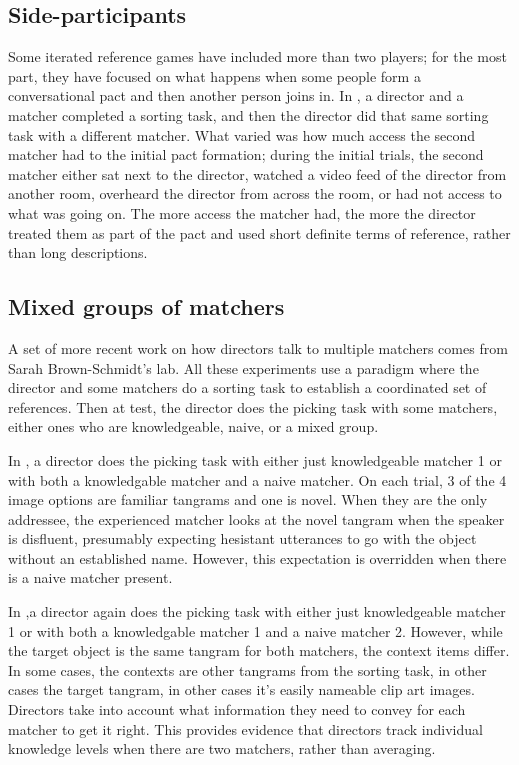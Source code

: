 \documentclass[11pt]{article}
\begin{document}
\subsection{Side-participants}
	Some iterated reference games have included more than two players; for the most part, they have focused on what happens when some people form a conversational pact and then another person joins in. 
	In 	\cite{wilkes-gibbsCoordinatingBeliefsConversation1992}, a director and a matcher completed a sorting task, and then the director did that same sorting task with a different matcher. What varied was how much access the second matcher had to the initial pact formation; during the initial trials, the second matcher either sat next to the director, watched a video feed of the director from another room, overheard the director from across the room, or had not access to what was going on. The more access the matcher had, the more the director treated them as part of the pact and used short definite terms of reference, rather than long descriptions.
	
	\subsection{Mixed groups of matchers}
	A set of more recent work on how directors talk to multiple matchers comes from Sarah Brown-Schmidt's lab. All these experiments use a paradigm where the director and some matchers do a sorting task to establish a coordinated set of references. Then at test, the director does the picking task with some matchers, either ones who are knowledgeable, naive, or a mixed group.
	
	In \cite{yoonAdjustingConceptualPacts2014}, a director does the picking task with either just knowledgeable matcher 1 or with both a knowledgable matcher and a naive matcher. On each trial, 3 of the 4 image options are familiar tangrams and one is novel. When they are the only addressee, the experienced matcher looks at the novel tangram when the speaker is disfluent, presumably expecting hesistant utterances to go with the object without an established name. However, this expectation is overridden when there is a naive matcher present. 
	
	In \cite{yoonContextualIntegrationMultiparty2019},a director again does the picking task with either just knowledgeable matcher 1 or with both a knowledgable matcher 1  and a naive matcher 2. However, while the target object is the same tangram for both matchers, the context items differ. In some cases, the contexts are other tangrams from the sorting task, in other cases the target tangram, in other cases it's easily nameable clip art images. Directors take into account what information they need to convey for each matcher to get it right. This provides evidence that directors track individual knowledge levels when there are two matchers, rather than averaging.   
	
\end{document}

